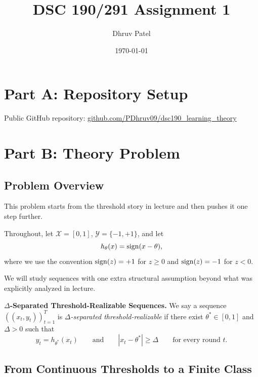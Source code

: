 \documentclass{article}
\title{\textbf{DSC 190/291 Assignment 1}}
\author{Dhruv Patel}
\date{\today}
\begin{document}

\maketitle
\tableofcontents
\newpage

\section{Part A: Repository Setup}
Public GitHub repository: \href{https://github.com/PDhruv09/dsc190_learning_theory}{github.com/PDhruv09/dsc190_learning_theory}
\section{Part B: Theory Problem}
\subsection{Problem Overview}

This problem starts from the threshold story in lecture and then pushes it one
step further.

Throughout, let $\mathcal{X} = [0,1]$, $\mathcal{Y} = \{-1,+1\}$, and let
\[
h_\theta(x) = \operatorname{sign}(x-\theta),
\]
where we use the convention $\operatorname{sign}(z)=+1$ for $z \ge 0$ and $\operatorname{sign}(z)=-1$ for
$z<0$.

We will study sequences with one extra structural assumption beyond what was
explicitly analyzed in lecture.
\newline

\textbf{$\Delta$-Separated Threshold-Realizable Sequences.}
We say a sequence $((x_t,y_t))_{t=1}^T$ is \emph{$\Delta$-separated
threshold-realizable} if there exist $\theta^* \in [0,1]$ and $\Delta > 0$
such that
\[
y_t = h_{\theta^*}(x_t)
\qquad \text{and} \qquad
|x_t-\theta^*| \ge \Delta
\qquad \text{for every round } t.
\]

\qquad
\qquad

\subsection{From Continuous Thresholds to a Finite Class}
\end{document}
